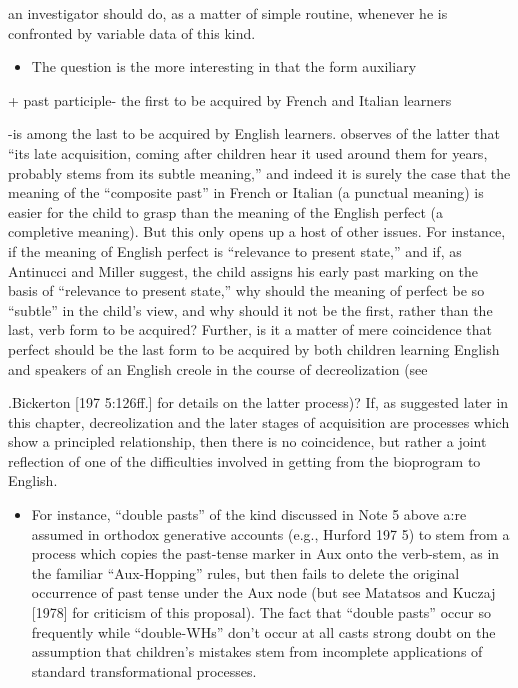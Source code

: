 \begin{itemize}
\begin{itemize}
\begin{itemize}
\begin{itemize}

an investigator should do, as a matter of simple routine, whenever he is confronted by variable data of this kind.

\begin{itemize}
\item The question is the more interesting in that the form auxiliary
\end{itemize}

+ past participle- the first to be acquired by French and Italian learners

{}-is among the last to be acquired by English learners. \citet{Maratsos1979} observes of the latter that ``its late acquisition, coming after children hear it used around them for years, probably stems from its subtle meaning,'' and indeed it is surely the case that the meaning of the ``composite past'' in French or Italian (a punctual meaning) is easier for the child to grasp than the meaning of the English perfect (a com\-pletive meaning). But this only opens up a host of other issues. For instance, if the meaning of English perfect is ``relevance to present state,'' and if, as Antinucci and Miller suggest, the child assigns his early past marking on the basis of ``relevance to present state,'' why should the meaning of perfect be so ``subtle'' in the child's view, and why should it not be the first, rather than the last, verb form to be acquired? Further, is it a matter of mere coincidence that perfect should be the last form to be acquired by both children learning English and speakers of an English creole in the course of decreolization (see

.Bickerton [197 5:126ff.] for details on the latter process)? If, as suggested later in this chapter, decreolization and the later stages of acquisition are processes which show a principled relationship, then there is no coincidence, but rather a joint reflection of one of the difficulties involved in getting from the bioprogram to English.

\begin{itemize}
\item For instance, ``double pasts'' of the kind discussed in Note 5 above a:re assumed in orthodox generative accounts (e.g., Hurford 197 5) to stem from a process which copies the past-tense marker in Aux onto the verb-stem, as in the familiar ``Aux-Hopping'' rules, but then fails to delete the original occurrence of past tense under the Aux node (but see Matatsos and Kuczaj [1978] for criticism of this proposal). The fact that ``double pasts'' occur so frequently while ``double-WHs'' don't occur at all casts strong doubt on the assumption that children's mistakes stem from incomplete applications of standard transformational processes.
\end{itemize}


\end{itemize}
\end{itemize}
\end{itemize}
\end{itemize}
